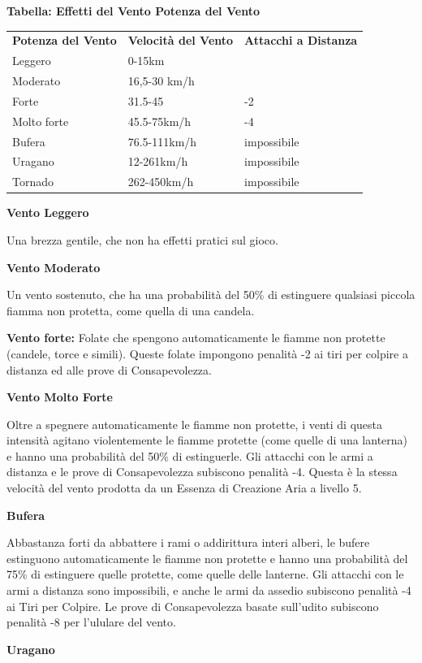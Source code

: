 \documentclass[a4paper,11pt,twoside,openany]{book}
\begin{document}
\textbf{Tabella: Effetti del Vento Potenza del Vento}

\medskip

\begin{tabular}{lll}
	\toprule
	\textbf{Potenza del Vento} & \textbf{Velocità del Vento}   & \textbf{Attacchi a Distanza} \\
	Leggero     & 0-15km \tabularnewline
	Moderato    & 16,5-30 km/h  \tabularnewline
	Forte       & 31.5-45        & -2 \tabularnewline
	Molto forte & 45.5-75km/h    & -4 \tabularnewline
	Bufera      & 76.5-111km/h   & impossibile  \tabularnewline
	Uragano     & 12-261km/h     & impossibile \tabularnewline
	Tornado     & 262-450km/h    & impossibile\tabularnewline
\end{tabular}

\bigskip

\textbf{Vento Leggero}

Una brezza gentile, che non ha effetti pratici sul gioco.

\textbf{Vento Moderato}

Un vento sostenuto, che ha una probabilità del 50\% di estinguere qualsiasi piccola fiamma non protetta, come quella di una candela.

\textbf{Vento forte:} Folate che spengono automaticamente le fiamme non protette (candele, torce e simili). Queste folate impongono penalità -2 ai tiri per colpire a distanza ed alle prove di Consapevolezza.

\textbf{Vento Molto Forte}

Oltre a spegnere automaticamente le fiamme non protette, i venti di questa intensità agitano violentemente le fiamme protette (come quelle di una lanterna) e hanno una probabilità del 50\% di estinguerle. Gli attacchi con le armi a distanza e le prove di Consapevolezza subiscono penalità -4. Questa è la stessa velocità del vento prodotta da un Essenza di Creazione Aria a livello 5.

\textbf{Bufera}

Abbastanza forti da abbattere i rami o addirittura interi alberi, le bufere estinguono automaticamente le fiamme non protette e hanno una probabilità del 75\% di estinguere quelle protette, come quelle delle lanterne. Gli attacchi con le armi a distanza sono impossibili, e anche le armi da assedio subiscono penalità -4 ai Tiri per Colpire. Le prove di Consapevolezza basate sull'udito subiscono penalità -8 per l'ululare del vento.

\textbf{Uragano}
\end{document}
